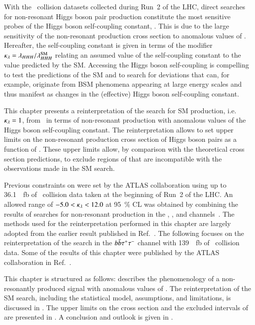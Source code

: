 With the \pp~collision datasets collected during Run~2 of the LHC,
direct searches for non-resonant Higgs boson pair production
constitute the most sensitive probes of the Higgs boson self-coupling
constant, \lambdahhh. This is due to the large sensitivity of the
non-resonant \HH production cross section to anomalous values of
\lambdahhh. Hereafter, the self-coupling constant is given in terms of
the modifier $\kappa_{\lambda} = \lambda_{HHH} / \lambda_{HHH}^{\text{SM}}$ relating
an assumed value of the self-coupling constant to the value predicted
by the SM. Accessing the Higgs boson self-coupling is compelling to
test the predictions of the SM and to search for deviations that can,
for example, originate from BSM phenomena appearing at large energy
scales and thus manifest as changes in the (effective) Higgs boson
self-coupling constant.

This chapter presents a reinterpretation of the search for SM \HH production,
i.e.\ $\kappa_{\lambda} = 1$, from~ in terms of non-resonant \HH
production with anomalous values of the Higgs boson self-coupling constant. The
reinterpretation allows to set upper limits on the non-resonant production cross
section of Higgs boson pairs as a function of \klambda. These upper limits
allow, by comparison with the theoretical cross section predictions, to exclude
regions of \klambda that are incompatible with the observations made in the SM
\HH search.

Previous constraints on \klambda were set by the ATLAS collaboration using up to
\SI{36.1}{\per\femto\barn} of \pp~collision data taken at the beginning of Run~2
of the LHC. An allowed range of $-5.0 < \kappa_{\lambda} < 12.0$ at \SI{95}{\percent} CL
was obtained by combining the results of searches for non-resonant \HH
production in the \bbtautau, \bbbb, and \bbyy channels~\cite{HDBS-2018-58}. The
methods used for the reinterpretation performed in this chapter are largely
adopted from the earlier result published in Ref.~\cite{HDBS-2018-58}. The
following focuses on the reinterpretation of the search in the $b\bar{b}\tau^{+} \tau^{-}$
channel with \SI{139}{\per\femto\barn} of \pp~collision data. Some of the
results of this chapter were published by the ATLAS collaboration in
Ref.~\cite{ATLAS-CONF-2021-052}.

This chapter is structured as follows: 
describes the phenomenology of a non-resonantly produced \HH signal
with anomalous values of \klambda. The reinterpretation of the SM \HH
search, including the statistical model, assumptions, and limitations,
is discussed in . The upper limits on the
cross section and the excluded intervals of \klambda are presented in
. A conclusion and outlook is given
in .


